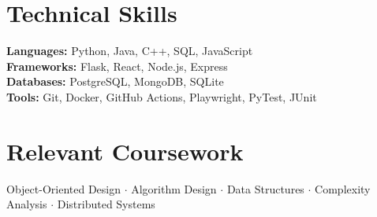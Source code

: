 \documentclass[letterpaper,10pt]{article}
\begin{document}
\section{Technical Skills}
\textbf{Languages:} Python, Java, C++, SQL, JavaScript \\
\textbf{Frameworks:} Flask, React, Node.js, Express \\
\textbf{Databases:} PostgreSQL, MongoDB, SQLite \\
\textbf{Tools:} Git, Docker, GitHub Actions, Playwright, PyTest, JUnit

\section{Relevant Coursework}
Object-Oriented Design \(\cdot\) Algorithm Design \(\cdot\) Data Structures \(\cdot\)
Complexity Analysis \(\cdot\) Distributed Systems
\end{document}
